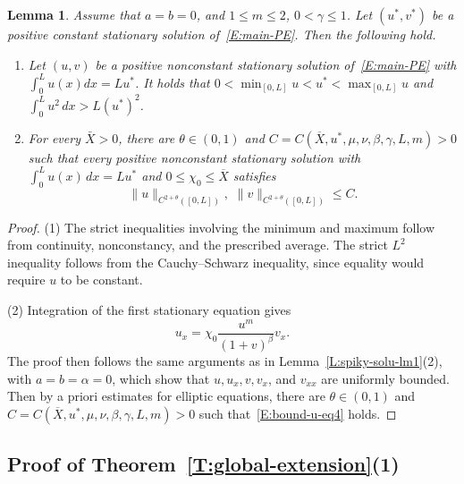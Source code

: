 \documentclass[11pt]{article} %
\newtheorem{lemma}{Lemma}[section]
\theoremstyle{remark}
\theoremstyle{remark}
\numberwithin{equation}{section}
\numberwithin{figure}{section}
\numberwithin{table}{section}
\begin{document}
\begin{lemma}\label{L:minimal-spike-bounds}
  Assume that $a = b = 0$,  and $1 \le m \le 2$, $0 < \gamma \le 1$. Let
  $(u^*,v^*)$ be a positive constant stationary solution of~\eqref{E:main-PE}.
  Then the following hold.
  \begin{enumerate}[label=(\arabic*)]
    \item    Let $(u,v)$ be a positive nonconstant  stationary  solution
      of~\eqref{E:main-PE} with $\int_0^L u(x)dx = L u^*$. It holds that $0 <
      \min_{[0,L]}u < u^* < \max_{[0,L]}u$ and $\int_0^L u^2\,dx > L(u^*)^2$.

    \item For every $\bar{X} > 0$, there are $\theta \in (0, 1)$ and $C =
      C(\overline{X}, u^*, \mu, \nu, \beta, \gamma, L, m) > 0$ such that every
      positive nonconstant stationary solution with $\int_0^L u(x)\,dx = Lu^*$
      and $0 \le \chi_0 \le
      \overline{X}$ satisfies
      \begin{equation}\label{E:bound-u-eq4}
        \|u\|_{C^{2+\theta}([0,L])},\,\, \|v\|_{C^{2+\theta}([0,L])}\le C.
      \end{equation}
  \end{enumerate}
\end{lemma}

\begin{proof}
  (1) The strict inequalities involving the minimum and maximum follow from
  continuity, nonconstancy, and the prescribed average. The strict $L^2$
  inequality follows from the Cauchy--Schwarz inequality, since equality would
  require $u$ to be constant.


  (2) Integration of the first stationary equation gives
  \begin{equation}\label{E:minimal-spike-flux}
    u_x=\chi_0\frac{u^m}{(1+v)^\beta}v_x.
  \end{equation}
  The proof then follows the same arguments as in
  Lemma~\ref{L:spiky-solu-lm1}(2), with $a = b = \alpha = 0$, which show that
  $u, u_x, v, v_x$, and $v_{xx}$ are uniformly bounded. Then by a priori
  estimates for elliptic equations, there are $\theta \in (0, 1)$ and
  $C = C(\overline{X}, u^*, \mu, \nu, \beta, \gamma, L, m) > 0$ such
  that~\eqref{E:bound-u-eq4} holds.
\end{proof}


\subsection{Proof of Theorem~\ref{T:global-extension}(1)}
\end{document}
